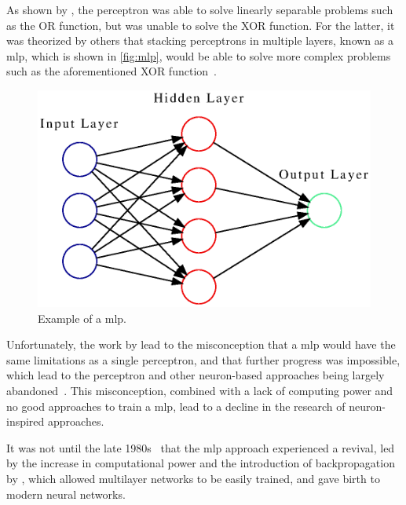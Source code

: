 \par
As shown by \textcite{perceptron3}, the perceptron was able to solve linearly separable problems such as the OR function, but was unable to solve the XOR function. For the latter, it was theorized by others that stacking perceptrons in multiple layers, known as a \gls*{mlp}, which is shown in \autoref{fig:mlp}, would be able to solve more complex problems such as the aforementioned XOR function~\cite{perceptron_misconceptions}.
\par
\begin{figure}[H]
    \centering
    \includegraphics[width=\linewidth]{resources/related_works/mlp.gv.eps}
    \caption[MLP Example]{Example of a \gls*{mlp}.}
    \label{fig:mlp}
\end{figure}
Unfortunately, the work by \textcite{perceptron3} lead to the misconception that a \gls*{mlp} would have the same limitations as a single perceptron, and that further progress was impossible, which lead to the perceptron and other neuron-based approaches being largely abandoned~\cite{perceptron_misconceptions}. This misconception, combined with a lack of computing power and no good approaches to train a \gls*{mlp}, lead to a decline in the research of neuron-inspired approaches.
\par
It was not until the late 1980s~\cite{perceptron_misconceptions} that the \gls*{mlp} approach experienced a revival, led by the increase in computational power and the introduction of backpropagation by \textcite{backprop}, which allowed multilayer networks to be easily trained, and gave birth to modern neural networks.
